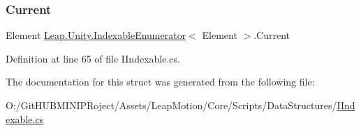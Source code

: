 \subsubsection{\texorpdfstring{Current}{Current}}
{\footnotesize\ttfamily Element \mbox{\hyperlink{struct_leap_1_1_unity_1_1_indexable_enumerator}{Leap.\+Unity.\+Indexable\+Enumerator}}$<$ Element $>$.Current\hspace{0.3cm}{\ttfamily [get]}}



Definition at line 65 of file I\+Indexable.\+cs.



The documentation for this struct was generated from the following file\+:\begin{DoxyCompactItemize}
\item 
O\+:/\+Git\+H\+U\+B\+M\+I\+N\+I\+P\+Roject/\+Assets/\+Leap\+Motion/\+Core/\+Scripts/\+Data\+Structures/\mbox{\hyperlink{_i_indexable_8cs}{I\+Indexable.\+cs}}\end{DoxyCompactItemize}
